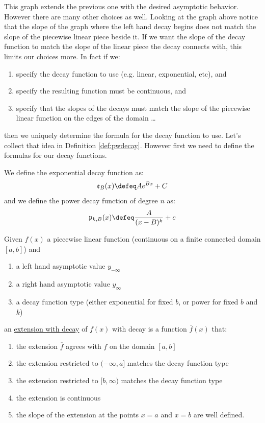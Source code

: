 \documentclass[10pt]{article}
\begin{document}
This graph extends the previous one with the desired asymptotic behavior.
However there are many other choices as well.  Looking at the graph above
notice that the slope of the graph where the left hand decay begins does
not match the slope of the piecewise linear piece beside it.  If we want
the slope of the decay function to match the slope of the linear piece the
decay connects with, this limits our choices more.  In fact if we:
\begin{enumerate}
\item specify the decay function to use (e.g. linear, exponential, etc), and
\item specify the resulting function must be continuous, and
\item specify that the slopes of the decays must match the slope of the piecewise linear
function on the edges of the domain \ldots
\end{enumerate}
then we uniquely determine the formula for the decay function to use.  Let's
collect that idea in Definition \ref{def:pwdecay}.  However first we need to
define the formulas for our decay functions.
\begin{definition}
We define the exponential decay function as:
$$\mathfrak{e}_B(x) \defeq Ae^{Bx}+C$$
and we define the power decay function of degree $n$ as:
$$\mathfrak{p}_{k,B}(x) \defeq \frac{A}{(x-B)^k}+c$$
\end{definition}

\begin{definition}
\label{def:pwdecay}
Given $f(x)$ a piecewise linear function (continuous on a finite connected domain $[a,b]$) and
\begin{enumerate}
\item a left hand asymptotic value $y_{-\infty}$
\item a right hand asymptotic value $y_{\infty}$
\item a decay function type (either exponential for fixed $b$, or power for fixed $b$ and $k$)
\end{enumerate}
an \ul{extension with decay} of $f(x)$ with decay is a function $\overline{f}(x)$ that:
\begin{enumerate}
\item the extension $\overline{f}$ agrees with $f$ on the domain $[a,b]$
\item the extension restricted to $(-\infty, a]$ matches the decay function type
\item the extension restricted to $[b, \infty)$ matches the decay function type
\item the extension is continuous
\item the slope of the extension at the points $x=a$ and $x=b$ are well defined.
\end{enumerate}
\end{definition}
\end{document}
